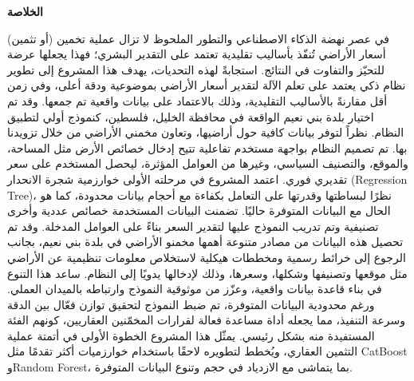\documentclass[12pt,oneside]{report}
\newenvironment{ARcentercol}[1][0.8\textwidth]{%
  \begin{Arabic}\begin{center}\begin{minipage}{#1}\justifying
}{%
  \end{minipage}\end{center}\end{Arabic}
}
\begin{document}
\clearpage
{}
{}
\begin{center}
  \Large\bfseries \textarabic{الخلاصة}
\end{center}

\begin{ARcentercol}
\singlespacing
في عصر نهضة الذكاء الاصطناعي والتطور الملحوظ لا تزال عملية تخمين (أو تثمين) أسعار الأراضي تُنفّذ بأساليب تقليدية تعتمد على التقدير البشري؛ فهذا يجعلها عرضة للتحيّز والتفاوت في النتائج.
استجابةً لهذه التحديات، يهدف هذا المشروع إلى تطوير نظام ذكي يعتمد على تعلم الآلة لتقدير أسعار الأراضي بموضوعية ودقة أعلى، وفي زمن أقل مقارنةً بالأساليب التقليدية، وذلك بالاعتماد على بيانات واقعية تم جمعها. وقد تم اختيار بلدة بني نعيم الواقعة في محافظة الخليل، فلسطين، كنموذج أولي لتطبيق النظام. نظراً لتوفر بيانات كافية حول أراضيها، وتعاون مخمني الأراضي من خلال تزويدنا بها.
تم تصميم النظام بواجهة مستخدم تفاعلية تتيح إدخال خصائص الأرض مثل المساحة، والموقع، والتصنيف السياسي، وغيرها من العوامل المؤثرة، ليحصل المستخدم على سعر تقديري فوري.
اعتمد المشروع في مرحلته الأولى خوارزمية شجرة الانحدار (Regression Tree)، نظرًا لبساطتها وقدرتها على التعامل بكفاءة مع أحجام بيانات محدودة، كما هو الحال مع البيانات المتوفرة حاليًا.
تضمنت البيانات المستخدمة خصائص عددية وأخرى تصنيفية وتم تدريب النموذج عليها لتقدير السعر بناءً على العوامل المدخلة.
وقد تم تحصيل هذه البيانات من مصادر متنوعة أهمها مخمنو الأراضي في بلدة بني نعيم، بجانب الرجوع إلى خرائط رسمية ومخططات هيكلية لاستخلاص معلومات تنظيمية عن الأراضي مثل موقعها وتصنيفها وشكلها، وسعرها، وذلك لإدخالها يدويًا إلى النظام. ساعد هذا التنوع في بناء قاعدة بيانات واقعية، وعزّز من موثوقية النموذج وارتباطه بالميدان العملي. ورغم محدودية البيانات المتوفرة، تم ضبط النموذج لتحقيق توازن فعّال بين الدقة وسرعة التنفيذ، مما يجعله أداة مساعدة فعالة لقرارات المخمّنين العقاريين، كونهم الفئة المستفيدة منه بشكل رئيسي.
يمثّل هذا المشروع الخطوة الأولى في أتمتة عملية التثمين العقاري، ويُخطط لتطويره لاحقًا باستخدام خوارزميات أكثر تقدمًا مثل CatBoost وRandom Forest، بما يتماشى مع الازدياد في حجم وتنوع البيانات المتوفرة.
\end{ARcentercol}



\clearpage
\tableofcontents

\clearpage
{\renewcommand{\numberline}[1]{}\listoftables}

\clearpage
{\renewcommand{\numberline}[1]{}\listoffigures}


\clearpage
{}
\end{document}
